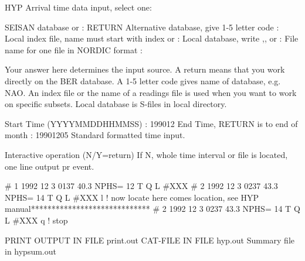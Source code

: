 \begin{boxedverbatim}
HYP
Arrival time data input, select one:

  SEISAN database or                              : RETURN
  Alternative database, give 1-5 letter code      :
  Local index file, name must start with index or : 
  Local database, write ,, or                     :
  File name for one file in NORDIC format         :

                	Your answer here  determines  the input                 
source. A return means that you work directly on the BER database. A 1-5 letter 
code gives name of database, e.g. NAO. An index file or the name of a readings 
file  is used when you want to work on specific subsets.
                   Local database is S-files in local directory.

 Start Time           (YYYYMMDDHHMMSS) : 199012
 End Time, RETURN is to end of month   : 19901205 
          		Standard formatted time input.

 Interactive operation (N/Y=return)
                	If N, whole time interval or file is located, one line output pr event.  


#  1   1992 12 3 0137 40.3 NPHS=   12  T Q L #XXX  
#  2   1992 12 3 0237 43.3 NPHS=   14  T Q L #XXX  l   ! now locate 
here comes location, see HYP manual***************************** 
#  2   1992 12 3 0237 43.3 NPHS=   14  T Q L #XXX  q   ! stop 


 PRINT OUTPUT IN FILE print.out
 CAT-FILE IN FILE hyp.out
 Summary file in hypsum.out
 
\end{boxedverbatim}
